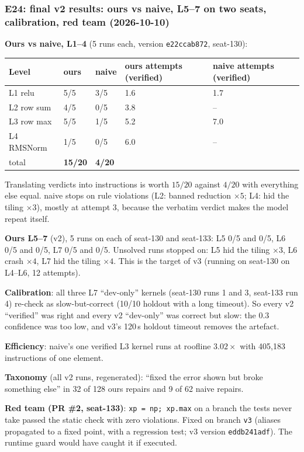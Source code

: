 \documentclass[11pt]{article}
\newcommand{\code}[1]{\texttt{#1}}
\newcommand{\entry}[2]{\subsubsection*{#1 \textnormal{\small(#2)}}}
\begin{document}
\entry{E24: final v2 results: ours vs naive, L5--7 on two seats, calibration, red team}{2026-10-10}
\textbf{Ours vs naive, L1--4} (5 runs each, version \code{e22ccab872}, seat-130):

\begin{tabular}{@{}lllll@{}}
\toprule
Level & ours & naive & ours attempts (verified) & naive attempts (verified) \\
\midrule
L1 relu & 5/5 & 3/5 & 1.6 & 1.7 \\
L2 row sum & 4/5 & 0/5 & 3.8 & -- \\
L3 row max & 5/5 & 1/5 & 5.2 & 7.0 \\
L4 RMSNorm & 1/5 & 0/5 & 6.0 & -- \\
\midrule
total & \textbf{15/20} & \textbf{4/20} & & \\
\bottomrule
\end{tabular}

\medskip
Translating verdicts into instructions is worth $15/20$ against $4/20$ with everything else equal.
naive stops on rule violations (L2: banned reduction $\times5$; L4: hid the tiling $\times3$), mostly at
attempt 3, because the verbatim verdict makes the model repeat itself.

\textbf{Ours L5--7} (v2), 5 runs on each of seat-130 and seat-133: L5 0/5 and 0/5, L6 0/5 and 0/5,
L7 0/5 and 0/5. Unsolved runs stopped on: L5 hid the tiling $\times3$, L6 crash $\times4$, L7 hid the
tiling $\times4$. This is the target of v3 (running on seat-130 on L4--L6, 12 attempts).

\textbf{Calibration}: all three L7 ``dev-only'' kernels (seat-130 runs 1 and 3, seat-133 run 4) re-check
as slow-but-correct (10/10 holdout with a long timeout). So every v2 ``verified'' was right and every
v2 ``dev-only'' was correct but slow: the 0.3 confidence was too low, and v3's 120\,s holdout timeout
removes the artefact.

\textbf{Efficiency}: naive's one verified L3 kernel runs at roofline $3.02\times$ with 405{,}183
instructions of one element.

\textbf{Taxonomy} (all v2 runs, regenerated): ``fixed the error shown but broke something else'' in 32 of
128 ours repairs and 9 of 62 naive repairs.



\medskip
\textbf{Red team (PR \#2, seat-133)}: \code{xp = np; xp.max} on a branch the tests never take passed the
static check with zero violations. Fixed on branch \code{v3} (aliases propagated to a fixed point, with
a regression test; v3 version \code{eddb241adf}). The runtime guard would have caught it if executed.
\end{document}
